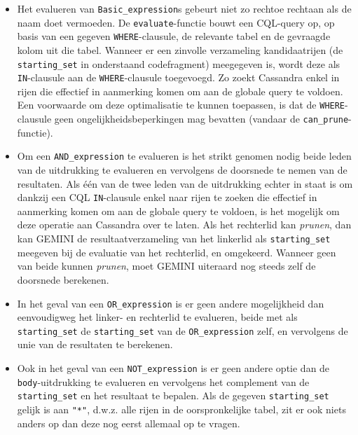 \begin{itemize}
\item Het evalueren van \texttt{Basic\_expression}s gebeurt niet zo rechtoe rechtaan als de naam doet vermoeden. De \texttt{evaluate}-functie bouwt een CQL-query op, op basis van een gegeven \texttt{WHERE}-clausule, de relevante tabel en de gevraagde kolom uit die tabel. Wanneer er een zinvolle verzameling kandidaatrijen (de \texttt{starting\_set} in onderstaand codefragment) meegegeven is, wordt deze als \texttt{IN}-clausule aan de \texttt{WHERE}-clausule toegevoegd. Zo zoekt Cassandra enkel in rijen die effectief in aanmerking komen om aan de globale query te voldoen. Een voorwaarde om deze optimalisatie te kunnen toepassen, is dat de \texttt{WHERE}-clausule geen ongelijkheidsbeperkingen mag bevatten (vandaar de \texttt{can\_prune}-functie).




\item Om een \texttt{AND\_expression} te evalueren is het strikt genomen nodig beide leden van de uitdrukking te evalueren en vervolgens de doorsnede te nemen van de resultaten. Als \'e\'en van de twee leden van de uitdrukking echter in staat is om dankzij een CQL \texttt{IN}-clausule enkel naar rijen te zoeken die effectief in aanmerking komen om aan de globale query te voldoen, is het mogelijk om deze operatie aan Cassandra over te laten. Als het rechterlid kan \textit{prunen}, dan kan GEMINI de resultaatverzameling van het linkerlid als \texttt{starting\_set} meegeven bij de evaluatie van het rechterlid, en omgekeerd. Wanneer geen van beide kunnen \textit{prunen}, moet GEMINI uiteraard nog steeds zelf de doorsnede berekenen.




\item In het geval van een \texttt{OR\_expression} is er geen andere mogelijkheid dan eenvoudigweg het linker- en rechterlid te evalueren, beide met als \texttt{starting\_set} de \texttt{starting\_set} van de \texttt{OR\_expression} zelf, en vervolgens de unie van de resultaten te berekenen.

\item Ook in het geval van een \texttt{NOT\_expression} is er geen andere optie dan de \texttt{body}-uitdrukking te evalueren en vervolgens het complement van de \texttt{starting\_set} en het resultaat te bepalen. Als de gegeven \texttt{starting\_set} gelijk is aan \texttt{"*"}, d.w.z. alle rijen in de oorspronkelijke tabel, zit er ook niets anders op dan deze nog eerst allemaal op te vragen.




\end{itemize}

